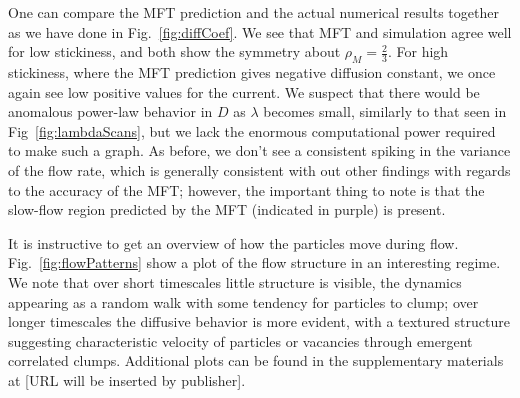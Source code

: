 \documentclass[
reprint,
 amsmath,amssymb,
 aps,
 prl,
]{revtex4-1}
\begin{document}
One can compare the MFT prediction and the actual numerical results together as we have done in Fig.~\ref{fig:diffCoef}. We see that MFT and simulation agree well for low stickiness, and both show the symmetry
about $\rho_M = \frac{2}{3}$. For high stickiness, where the MFT prediction gives negative diffusion constant, we once again see low positive values for the current.  We suspect that there would be anomalous power-law behavior in $D$ as $\lambda$
becomes small, similarly to that seen in Fig~\ref{fig:lambdaScans}, but we lack the enormous computational power required to make such a graph. As before, we don't see a consistent spiking in the variance of the flow rate,
which is generally consistent with out other findings with
regards to the accuracy of the MFT; however, the important thing to note is that the slow-flow region predicted by the MFT (indicated in purple) is present.

It is instructive to get an overview of how the particles move during flow. Fig.~\ref{fig:flowPatterns} show a plot of the flow structure in an interesting regime.
We note that over short timescales little structure is visible, the dynamics appearing as a random walk with some tendency for particles to clump; over longer timescales the diffusive behavior is more evident, with a textured structure
suggesting characteristic velocity of  particles or vacancies through emergent correlated clumps.
Additional plots can be found in the supplementary materials at [URL will be inserted by publisher].
\end{document}
